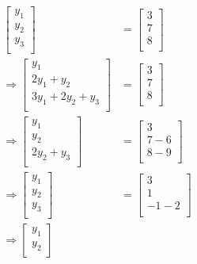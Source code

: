 \documentclass{article}
\begin{document}
\begin{align*}
\begin{bmatrix}
         y_1 \\
          y_2\\
          y_3\\
    \end{bmatrix}&=\begin{bmatrix}
         3 \\
          7\\
          8\\
    \end{bmatrix}\\
    \Longrightarrow \begin{bmatrix}
         y_1 \\
          2y_1+y_2 \\
          3y_1+2y_2 +y_3\\
    \end{bmatrix}&=\begin{bmatrix}
         3 \\
          7\\
          8\\
    \end{bmatrix}\\
    \Longrightarrow \begin{bmatrix}
         y_1 \\
         y_2 \\
         2y_2 +y_3 \\
    \end{bmatrix}&=\begin{bmatrix}
         3 \\
          7-6\\
          8-9\\
    \end{bmatrix}\\
    \Longrightarrow \begin{bmatrix}
         y_1 \\
         y_2 \\
         y_3 \\
    \end{bmatrix}&=\begin{bmatrix}
         3 \\
         1 \\
         -1-2 \\
    \end{bmatrix}\\
    \Longrightarrow \begin{bmatrix}
         y_1 \\
         y_2 \\

\end{bmatrix}
\end{align*}
\end{document}
